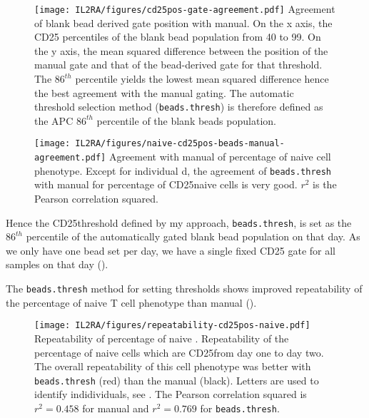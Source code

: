 \begin{figure}[h]
\centering
  \texttt{[image: IL2RA/figures/cd25pos-gate-agreement.pdf]}
{ Agreement of blank bead derived gate position with manual. }
{
On the x axis, the CD25 percentiles of the blank bead population from 40 to 99.
On the y axis, the mean squared difference between the position of the manual gate and that of the bead-derived gate for that threshold.
The $86^{th}$ percentile yields the lowest mean squared difference hence the best agreement with the manual gating.
The automatic threshold selection method (\texttt{beads.thresh}) is therefore defined as the APC $86^{th}$ percentile of the blank beads population.
}
\end{figure}

\begin{figure}[h]
\centering
\texttt{[image: IL2RA/figures/naive-cd25pos-beads-manual-agreement.pdf]}
{ Agreement with manual of percentage of \positive naive cell phenotype. }
{
  Except for individual d, the agreement of \texttt{beads.thresh} with manual for percentage of CD25\positive naive cells
  is very good.  $r^2$ is the Pearson correlation squared.
}
\end{figure}

Hence the CD25\positive threshold defined by my approach, \texttt{beads.thresh}, is set as the $86^{th}$ percentile of the automatically gated blank bead population on that day.
As we only have one bead set per day, we have a single fixed CD25 gate for all samples on that day ().

The \texttt{beads.thresh} method for setting  thresholds  shows improved repeatability of the percentage of \positive naive T cell phenotype
than manual ().  


\begin{figure}[h]
\centering
\texttt{[image: IL2RA/figures/repeatability-cd25pos-naive.pdf]}
{ Repeatability of percentage of naive \positive. }
{
Repeatability of the percentage of naive cells which are CD25\positive from day one to day two.
The overall repeatability of this cell phenotype was better with \texttt{beads.thresh} (red)
than the manual (black).
Letters are used to identify indidividuals, see .
The Pearson correlation squared is $r^2=0.458$ for manual and $r^2=0.769$ for \texttt{beads.thresh}.
}
\end{figure}

